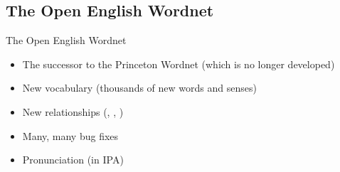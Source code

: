 \documentclass{beamer}
\begin{document}
    

\subsection{The Open English Wordnet}
  \begin{frame}{The Open English Wordnet}
      \begin{itemize}
      \item The successor to the Princeton Wordnet (which is no
        longer developed)
      \item New vocabulary (thousands of new words and senses)
      \item New relationships (, , )
      \item Many, many bug fixes
      \item Pronunciation (in IPA)
      \end{itemize}

  \end{frame}
\end{document}
